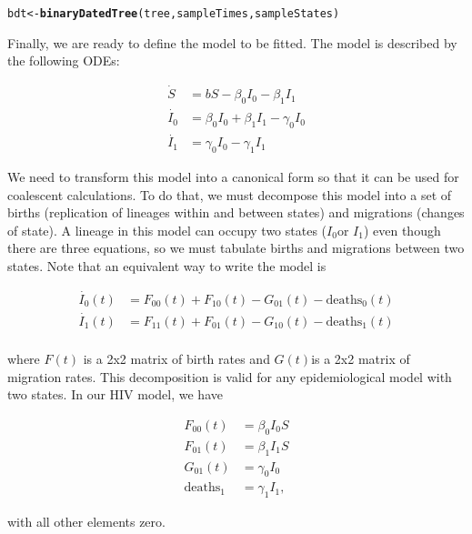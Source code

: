 \documentclass[english]{article}\usepackage[]{graphicx}\usepackage[]{color}
\makeatletter
\newcommand{\hlstd}[1]{\textcolor[rgb]{0.345,0.345,0.345}{#1}}%
\newcommand{\hlkwb}[1]{\textcolor[rgb]{0.69,0.353,0.396}{#1}}%
\newcommand{\hlkwd}[1]{\textcolor[rgb]{0.737,0.353,0.396}{\textbf{#1}}}%
\newenvironment{kframe}{%
 \def\at@end@of@kframe{}%
 \ifinner\ifhmode%
  \def\at@end@of@kframe{\end{minipage}}%
  \begin{minipage}{\columnwidth}%
 \fi\fi%
 \def\FrameCommand##1{\hskip\@totalleftmargin \hskip-\fboxsep
 \colorbox{shadecolor}{##1}\hskip-\fboxsep
     \hskip-\linewidth \hskip-\@totalleftmargin \hskip\columnwidth}%
 \MakeFramed {\advance\hsize-\width
   \@totalleftmargin\z@ \linewidth\hsize
   \@setminipage}}%
 {\par\unskip\endMakeFramed%
 \at@end@of@kframe}
\newenvironment{knitrout}{}{} %
\makeatother
\begin{document}
\begin{knitrout}
\color{fgcolor}\begin{kframe}
\begin{alltt}
\hlstd{bdt} \hlkwb{<-} \hlkwd{binaryDatedTree}\hlstd{(tree, sampleTimes, sampleStates)}
\end{alltt}
\end{kframe}
\end{knitrout}


Finally, we are ready to define the model to be fitted. The model
is described by the following ODEs:

\begin{align}
\dot{S} &= b S - \beta_0 I_0 - \beta_1 I_1 \\
\dot{I_0} &= \beta_0 I_0 + \beta_1 I_1 - \gamma_0 I_0  \\
\dot{I_1} &= \gamma_0 I_0 - \gamma_1 I_1
\end{align}

We need to transform this model into a canonical form so that it can
be used for coalescent calculations. To do that, we must decompose
this model into a set of births (replication of lineages within and
between states) and migrations (changes of state). A lineage in this
model can occupy two states ($I_{0}$or $I_{1}$) even though there
are three equations, so we must tabulate births and migrations between
two states. Note that an equivalent way to write the model is

\begin{align}
\dot{I_0}(t) &= F_{00}(t) + F_{10}(t) - G_{01}(t) - \mathrm{deaths}_0(t) \\
\dot{I_1}(t) &= F_{11}(t) + F_{01}(t) - G_{10}(t) - \mathrm{deaths}_1(t) \\
\end{align}

where $F(t)$ is a 2x2 matrix of birth rates and $G(t)$is a 2x2 matrix
of migration rates. This decomposition is valid for any epidemiological
model with two states. In our HIV model, we have

\begin{align}
F_{00}(t) &= \beta_0 I_0 S \\
F_{01}(t) &= \beta_1 I_1 S \\
G_{01}(t) &= \gamma_0 I_0 \\
\mathrm{deaths}_1 &= \gamma_1 I_1,
\end{align}

with all other elements zero. 
\end{document}
